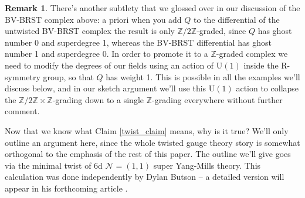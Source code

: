 \documentclass[11pt, oneside, reqno]{amsart}
\theoremstyle{definition} \newtheorem{definition}{Definition}[section]
\theoremstyle{definition} \newtheorem{remark}[definition]{Remark}
\theoremstyle{definition} \newtheorem{remarks}[definition]{Remarks}
\theoremstyle{definition} \newtheorem{question}[definition]{Question}
\theoremstyle{definition} \newtheorem*{note}{Note}
\theoremstyle{definition} \newtheorem{example}[definition]{Example}
\theoremstyle{definition} \newtheorem{examples}[definition]{Examples}
\newcommand{\mr}[1]{\mathrm{#1}}
\newcommand{\mc}[1]{\mathcal{#1}}
\newcommand{\ZZ}{\mathbb{Z}}
\begin{document}
\begin{remark}
There's another subtlety that we glossed over in our discussion of the BV-BRST complex above: a priori when you add $Q$ to the differential of the untwisted BV-BRST complex the result is only $\ZZ/2\ZZ$-graded, since $Q$ has ghost number 0 and superdegree 1, whereas the BV-BRST differential has ghost number 1 and superdegree 0.  In order to promote it to a $\ZZ$-graded complex we need to modify the degrees of our fields using an action of $\mr U(1)$ inside the R-symmetry group, so that $Q$ has weight 1.  This is possible in all the examples we'll discuss below, and in our sketch argument we'll use this $\mr U(1)$ action to collapse the $\ZZ/2\ZZ \times \ZZ$-grading down to a single $\ZZ$-grading everywhere without further comment.
\end{remark}

Now that we know what Claim \ref{twist_claim} means, why is it true?  We'll only outline an argument here, since the whole twisted gauge theory story is somewhat orthogonal to the emphasis of the rest of this paper.  The outline we'll give goes via the minimal twist of 6d $\mc N=(1,1)$ super Yang-Mills theory.  This calculation was done independently by Dylan Butson -- a detailed version will appear in his forthcoming article \cite{Butson}.
\end{document}
